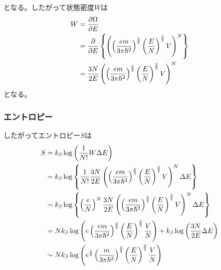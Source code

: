 \documentclass{jsarticle}  %
\numberwithin{equation}{section} %
\numberwithin{figure}{section}
\begin{document}
    となる。したがって状態密度$W$は
    \begin{align}
        W  &= \frac{\partial \Omega}{\partial E} \notag \\
        &= \frac{\partial}{\partial E} \left\{ \left( \left( \frac{em}{3 \pi \hbar^2} \right)^{\frac{3}{2}} \left( \frac{E}{N} \right)^{\frac{3}{2}} V \right)^{N} \right\} \notag \\
        &= \frac{3N}{2E} \left( \left( \frac{em}{3 \pi \hbar^2} \right)^{\frac{3}{2}} \left( \frac{E}{N} \right)^{\frac{3}{2}} V \right)^{N} \notag
    \end{align}
    となる。
\subsubsection{エントロピー}
    したがってエントロピー$S$は
    \begin{align}
        S &= k_\beta \log \left( \frac{1}{N!} W \Delta E \right) \notag \\
        &= k_\beta \log \left\{ \frac{1}{N!}\frac{3N}{2E} \left( \left( \frac{em}{3 \pi \hbar^2} \right)^{\frac{3}{2}} \left( \frac{E}{N} \right)^{\frac{3}{2}} V \right)^{N} \Delta E \right\} \notag \\
        &\sim k_\beta \log \left\{ \left( \frac{e}{N} \right)^N \frac{3N}{2E} \left( \left( \frac{em}{3 \pi \hbar^2} \right)^{\frac{3}{2}} \left( \frac{E}{N} \right)^{\frac{3}{2}} V \right)^{N} \Delta E \right\} \notag \\
        &= Nk_\beta \log \left( e\left( \frac{em}{3 \pi \hbar^2} \right)^{\frac{3}{2}} \left( \frac{E}{N} \right)^{\frac{3}{2}} \frac{V}{N} \right) + k_\beta \log \left( \frac{3N}{2E} \Delta E \right) \notag \\
        &\sim Nk_\beta \log \left( e^{\frac{5}{2}} \left(\frac{m}{3 \pi \hbar^2} \right)^{\frac{3}{2}} \left( \frac{E}{N} \right)^{\frac{3}{2}} \frac{V}{N} \right)
    \end{align}
\end{document}
